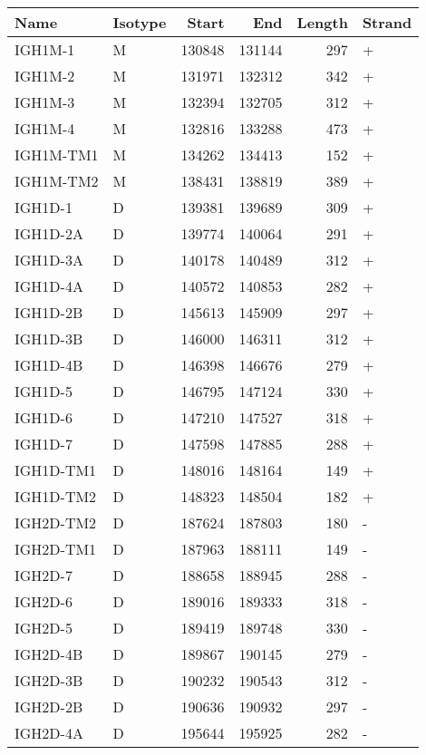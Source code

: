 \begin{tabular}{llrrrl}
  \toprule Name & Isotype & Start & End & Length & Strand \\ 
  \midrule IGH1M-1 & M & 130848 & 131144 & 297 & + \\ 
  IGH1M-2 & M & 131971 & 132312 & 342 & + \\ 
  IGH1M-3 & M & 132394 & 132705 & 312 & + \\ 
  IGH1M-4 & M & 132816 & 133288 & 473 & + \\ 
  IGH1M-TM1 & M & 134262 & 134413 & 152 & + \\ 
  IGH1M-TM2 & M & 138431 & 138819 & 389 & + \\ 
  IGH1D-1 & D & 139381 & 139689 & 309 & + \\ 
  IGH1D-2A & D & 139774 & 140064 & 291 & + \\ 
  IGH1D-3A & D & 140178 & 140489 & 312 & + \\ 
  IGH1D-4A & D & 140572 & 140853 & 282 & + \\ 
  IGH1D-2B & D & 145613 & 145909 & 297 & + \\ 
  IGH1D-3B & D & 146000 & 146311 & 312 & + \\ 
  IGH1D-4B & D & 146398 & 146676 & 279 & + \\ 
  IGH1D-5 & D & 146795 & 147124 & 330 & + \\ 
  IGH1D-6 & D & 147210 & 147527 & 318 & + \\ 
  IGH1D-7 & D & 147598 & 147885 & 288 & + \\ 
  IGH1D-TM1 & D & 148016 & 148164 & 149 & + \\ 
  IGH1D-TM2 & D & 148323 & 148504 & 182 & + \\ 
  IGH2D-TM2 & D & 187624 & 187803 & 180 & - \\ 
  IGH2D-TM1 & D & 187963 & 188111 & 149 & - \\ 
  IGH2D-7 & D & 188658 & 188945 & 288 & - \\ 
  IGH2D-6 & D & 189016 & 189333 & 318 & - \\ 
  IGH2D-5 & D & 189419 & 189748 & 330 & - \\ 
  IGH2D-4B & D & 189867 & 190145 & 279 & - \\ 
  IGH2D-3B & D & 190232 & 190543 & 312 & - \\ 
  IGH2D-2B & D & 190636 & 190932 & 297 & - \\ 
  IGH2D-4A & D & 195644 & 195925 & 282 & - \\ 

\end{tabular}
